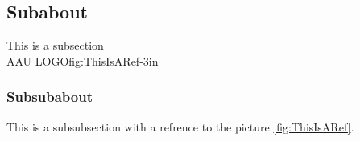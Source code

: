 \subsection{Subabout}
This is a subsection\\
	{AAU LOGO}{fig:ThisIsARef}{-3in}

\subsubsection{Subsubabout}
This is a subsubsection with a refrence to the picture \ref{fig:ThisIsARef}.
